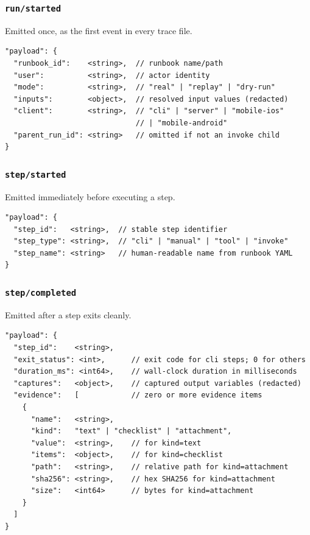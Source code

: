 \subsubsection{\texttt{run/started}}
\label{sec:run-started-event-client-field}

Emitted once, as the first event in every trace file.

\begin{verbatim}
"payload": {
  "runbook_id":    <string>,  // runbook name/path
  "user":          <string>,  // actor identity
  "mode":          <string>,  // "real" | "replay" | "dry-run"
  "inputs":        <object>,  // resolved input values (redacted)
  "client":        <string>,  // "cli" | "server" | "mobile-ios" 
                              // | "mobile-android"
  "parent_run_id": <string>   // omitted if not an invoke child
}
\end{verbatim}

\subsubsection{\texttt{step/started}}

Emitted immediately before executing a step.

\begin{verbatim}
"payload": {
  "step_id":   <string>,  // stable step identifier
  "step_type": <string>,  // "cli" | "manual" | "tool" | "invoke"
  "step_name": <string>   // human-readable name from runbook YAML
}
\end{verbatim}

\subsubsection{\texttt{step/completed}}

Emitted after a step exits cleanly.

\begin{verbatim}
"payload": {
  "step_id":    <string>,
  "exit_status": <int>,      // exit code for cli steps; 0 for others
  "duration_ms": <int64>,    // wall-clock duration in milliseconds
  "captures":   <object>,    // captured output variables (redacted)
  "evidence":   [            // zero or more evidence items
    {
      "name":   <string>,
      "kind":   "text" | "checklist" | "attachment",
      "value":  <string>,    // for kind=text
      "items":  <object>,    // for kind=checklist
      "path":   <string>,    // relative path for kind=attachment
      "sha256": <string>,    // hex SHA256 for kind=attachment
      "size":   <int64>      // bytes for kind=attachment
    }
  ]
}
\end{verbatim}

